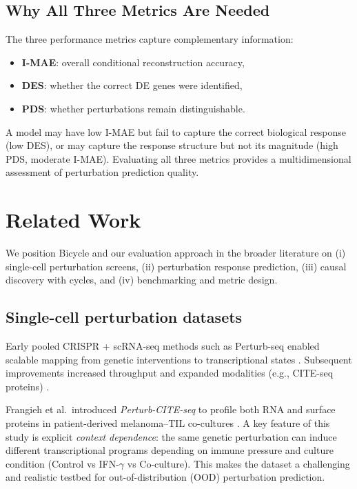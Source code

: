 \documentclass[12pt]{article}
\begin{document}
\subsection{Why All Three Metrics Are Needed}
The three performance metrics capture complementary information:
\begin{itemize}
    \item \textbf{I-MAE}: overall conditional reconstruction accuracy,
    \item \textbf{DES}: whether the correct DE genes were identified,
    \item \textbf{PDS}: whether perturbations remain distinguishable.
\end{itemize}
A model may have low I-MAE but fail to capture the correct biological response (low DES), or may
capture the response structure but not its magnitude (high PDS, moderate I-MAE). Evaluating all
three metrics provides a multidimensional assessment of perturbation prediction quality.

\section{Related Work}\label{relatedwork}
We position Bicycle and our evaluation approach in the broader literature on (i) single-cell
perturbation screens, (ii) perturbation response prediction, (iii) causal discovery with cycles, and
(iv) benchmarking and metric design.

\subsection{Single-cell perturbation datasets}
Early pooled CRISPR + scRNA-seq methods such as Perturb-seq enabled scalable mapping from
genetic interventions to transcriptional states \cite{dixit2016perturbseq,adamson2016multiplexed,jaitin2016immune}.
Subsequent improvements increased throughput and expanded modalities (e.g., CITE-seq proteins)
\cite{mimitou2019multimodal,datlinger2021ultra}.

Frangieh et al.\ introduced \emph{Perturb-CITE-seq} to profile both RNA and surface proteins in
patient-derived melanoma--TIL co-cultures \cite{frangieh2021perturbcite}. A key feature of this study is
explicit \emph{context dependence}: the same genetic perturbation can induce different transcriptional programs
depending on immune pressure and culture condition (Control vs IFN-$\gamma$ vs Co-culture). This makes the
dataset a challenging and realistic testbed for out-of-distribution (OOD) perturbation prediction.
\end{document}
